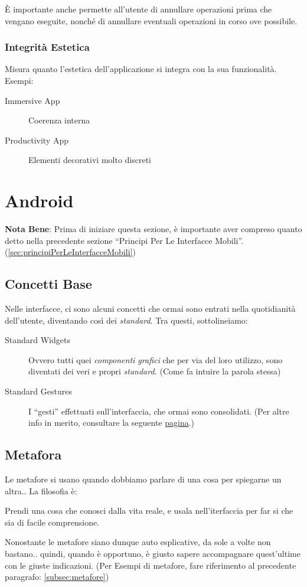 \documentclass[oneside]{book}
\begin{document}
				È importante anche permette all'utente di annullare operazioni prima che vengano eseguite, nonché di annullare eventuali operazioni in corso ove possibile.

			\subsubsection{Integrità Estetica} \label{sez:integritaEstetica}
				Misura quanto l’estetica dell’applicazione si integra con la sua funzionalità. Esempi:
				\begin{description}
				\item[Immersive App] Coerenza interna
				\item[Productivity App] Elementi decorativi molto discreti
				\end{description}

	\newpage
	\section{Android}
		\textbf{Nota Bene}: Prima di iniziare questa sezione, è importante aver compreso quanto detto nella precedente sezione ``Principi Per Le Interfacce Mobili''. (\ref{sec:principiPerLeInterfacceMobili})

		\subsection{Concetti Base}
			Nelle interfacce, ci sono alcuni concetti che ormai sono entrati nella quotidianità dell'utente, diventando così dei \emph{standard}. Tra questi, sottolineiamo:
			\begin{description}
			\item[Standard Widgets] Ovvero tutti quei \emph{componenti grafici} che per via del loro utilizzo, sono diventati dei veri e propri \emph{standard.} (Come fa intuire la parola stessa)
			\item[Standard Gestures] I ``gesti'' effettuati sull'interfaccia, che ormai sono consolidati. (Per altre info in merito, consultare la seguente \href{https://www.google.com/design/spec/patterns/gestures.html#}{pagina}.)
			\end{description}

		\subsection{Metafora} \label{sez:metafore}
			Le metafore si usano quando dobbiamo parlare di una cosa per spiegarne un altra.. La filosofia è:
			\begin{center}
			\begin{em}
			Prendi una cosa che conosci dalla vita reale, e usala nell'iterfaccia per far si che sia di facile comprensione.
			\end{em} 
			\end{center}
			Nonostante le metafore siano dunque auto esplicative, da sole a volte non bastano.. quindi, quando è opportuno, è giusto sapere accompagnare quest'ultime con le giuste indicazioni. (Per Esempi di metafore, fare riferimento al precedente paragrafo: \ref{subsec:metafore})
\end{document}

